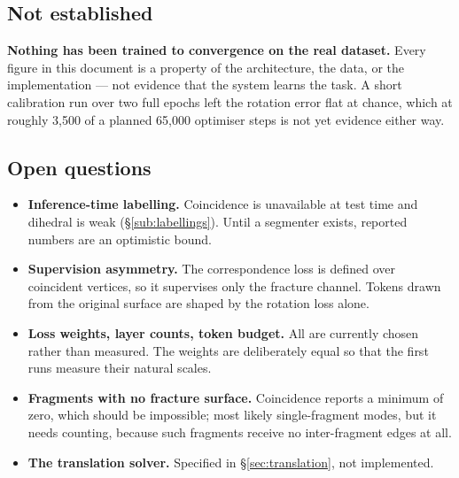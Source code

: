 \documentclass[11pt,a4paper]{report}
\begin{document}
\subsection{Not established}

\textbf{Nothing has been trained to convergence on the real dataset.} Every
figure in this document is a property of the architecture, the data, or the
implementation --- not evidence that the system learns the task. A short
calibration run over two full epochs left the rotation error flat at chance,
which at roughly 3{,}500 of a planned 65{,}000 optimiser steps is not yet
evidence either way.

\subsection{Open questions}

\begin{itemize}
\item \textbf{Inference-time labelling.} Coincidence is unavailable at test
      time and dihedral is weak (\S\ref{sub:labellings}). Until a segmenter exists, reported
      numbers are an optimistic bound.
\item \textbf{Supervision asymmetry.} The correspondence loss is defined over
      coincident vertices, so it supervises only the fracture channel. Tokens
      drawn from the original surface are shaped by the rotation loss alone.
\item \textbf{Loss weights, layer counts, token budget.} All are currently
      chosen rather than measured. The weights are deliberately equal so that
      the first runs measure their natural scales.
\item \textbf{Fragments with no fracture surface.} Coincidence reports a minimum
      of zero, which should be impossible; most likely single-fragment modes,
      but it needs counting, because such fragments receive no inter-fragment
      edges at all.
\item \textbf{The translation solver.} Specified in \S\ref{sec:translation}, not implemented.
\end{itemize}
\end{document}
